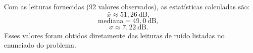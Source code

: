Com as leituras fornecidas (92 valores observados), as estatísticas calculadas são:
\[
\bar{x} \approx 51{,}26\ \text{dB},
\]
\[
\text{mediana} = 49{,}0\ \text{dB},
\]
\[
\sigma \approx 7{,}22\ \text{dB}.
\]
Esses valores foram obtidos diretamente das leituras de ruído listadas no enunciado do problema. 